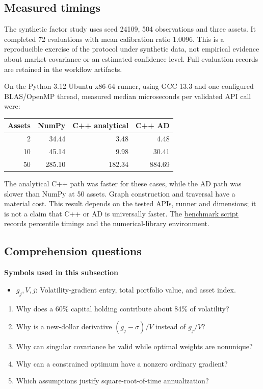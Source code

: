 \documentclass[
  american,
  11pt,
]{article}
\providecommand{\tightlist}{%
  \setlength{\itemsep}{0pt}\setlength{\parskip}{0pt}}
\begin{document}
\subsection{Measured timings}

The synthetic factor study uses seed 24109, 504 observations and three
assets. It completed 72 evaluations with mean calibration ratio 1.0096.
This is a reproducible exercise of the protocol under synthetic data,
not empirical evidence about market covariance or an estimated confidence
level. Full evaluation records are retained in the workflow artifacts.

On the Python 3.12 Ubuntu x86-64 runner, using GCC 13.3 and one configured
BLAS/OpenMP thread, measured median microseconds per validated API call were:

\begin{center}
\begin{tabular}{rrrr}
\toprule
Assets & NumPy & C++ analytical & C++ AD \\
\midrule
2 & 34.44 & 3.48 & 4.48 \\
10 & 45.14 & 9.98 & 30.41 \\
50 & 285.10 & 182.34 & 884.69 \\
\bottomrule
\end{tabular}
\end{center}

The analytical C++ path was faster for these cases, while the AD path was
slower than NumPy at 50 assets. Graph construction and traversal have a
material cost. This result depends on the tested APIs, runner and dimensions;
it is not a claim that C++ or AD is universally faster. The
\href{https://github.com/eshangark/portfolio-risk-engine/blob/main/examples/benchmark.py}{benchmark script}
records percentile timings and the numerical-library environment.


\subsection{Comprehension questions}\label{comprehension-questions}

\textbf{Symbols used in this subsection}
\begin{itemize}
\item \(g_j,V,j\): Volatility-gradient entry, total portfolio value, and asset index.
\end{itemize}


\begin{enumerate}
\def\labelenumi{\arabic{enumi}.}
\tightlist
\item
  Why does a 60\% capital holding contribute about 84\% of volatility?
\item
  Why is a new-dollar derivative \((g_j-\sigma)/V\) instead of
  \(g_j/V\)?
\item
  Why can singular covariance be valid while optimal weights are
  nonunique?
\item
  Why can a constrained optimum have a nonzero ordinary gradient?
\item
  Which assumptions justify square-root-of-time annualization?
\end{enumerate}
\end{document}
